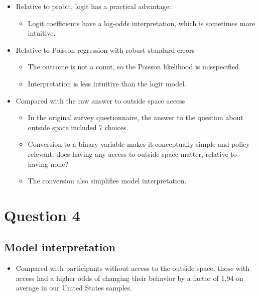 \documentclass[
  letterpaper,
  DIV=11,
  numbers=noendperiod]{scrartcl}
\providecommand{\tightlist}{%
  \setlength{\itemsep}{0pt}\setlength{\parskip}{0pt}}
\begin{document}
\begin{itemize}
\tightlist
\item
  Relative to probit, logit has a practical advantage:

  \begin{itemize}
  \tightlist
  \item
    Logit coefficients have a log-odds interpretation, which is
    sometimes more intuitive.
  \end{itemize}
\item
  Relative to Poisson regression with robust standard errors

  \begin{itemize}
  \tightlist
  \item
    The outcome is not a count, so the Poisson likelihood is
    misspecified.
  \item
    Interpretation is less intuitive than the logit model.
  \end{itemize}
\item
  Compared with the raw answer to outside space access

  \begin{itemize}
  \tightlist
  \item
    In the original survey questionnaire, the answer to the question
    about outside space included 7 choices.
  \item
    Conversion to a binary variable makes it conceptually simple and
    policy-relevant: does having any access to outside space matter,
    relative to having none?
  \item
    The conversion also simplifies model interpretation.
  \end{itemize}
\end{itemize}

\section{Question 4}\label{question-4}

\subsection{Model interpretation}\label{model-interpretation}

\begin{itemize}
\tightlist
\item
  Compared with participants without access to the outside space, those
  with access had a higher odds of changing their behavior by a factor
  of 1.94 on average in our United States samples.
\end{itemize}
\end{document}

